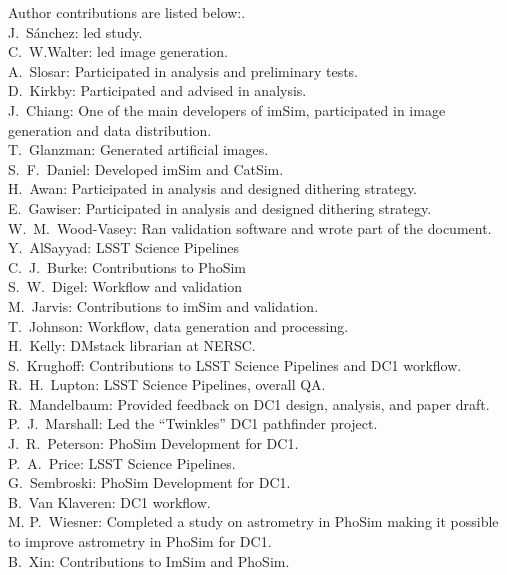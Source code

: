 Author contributions are listed below:. \\
J.~S\'{a}nchez: led study. \\
C.~W.Walter: led image generation. \\
A.~Slosar: Participated in analysis and preliminary tests. \\
D.~Kirkby: Participated and advised in analysis. \\
J.~Chiang: One of the main developers of imSim, participated in image generation and data distribution. \\
T.~Glanzman: Generated artificial images. \\
S.~F.~Daniel: Developed imSim and CatSim. \\
H.~Awan: Participated in analysis and designed dithering strategy. \\
E.~Gawiser: Participated in analysis and designed dithering strategy. \\
W.~M.~Wood-Vasey: Ran validation software and wrote part of the document. \\
Y.~AlSayyad: LSST Science Pipelines \\
C.~J.~Burke: Contributions to PhoSim \\
S.~W.~Digel: Workflow and validation \\
M.~Jarvis: Contributions to imSim and validation. \\
T.~Johnson: Workflow, data generation and processing. \\
H.~Kelly: DMstack librarian at NERSC. \\
S.~Krughoff: Contributions to LSST Science Pipelines and DC1 workflow. \\
R.~H.~Lupton: LSST Science Pipelines, overall QA. \\
R.~Mandelbaum: Provided feedback on DC1 design, analysis, and paper draft. \\
P.~J.~Marshall: Led the ``Twinkles'' DC1 pathfinder project. \\
J.~R.~Peterson: PhoSim Development for DC1. \\
P.~A.~Price: LSST Science Pipelines. \\
G.~Sembroski: PhoSim Development for DC1. \\
B.~Van Klaveren: DC1 workflow. \\
M. P.~Wiesner: Completed a study on astrometry in PhoSim making it possible to improve astrometry in PhoSim for DC1. \\
B.~Xin: Contributions to ImSim and PhoSim. \\

